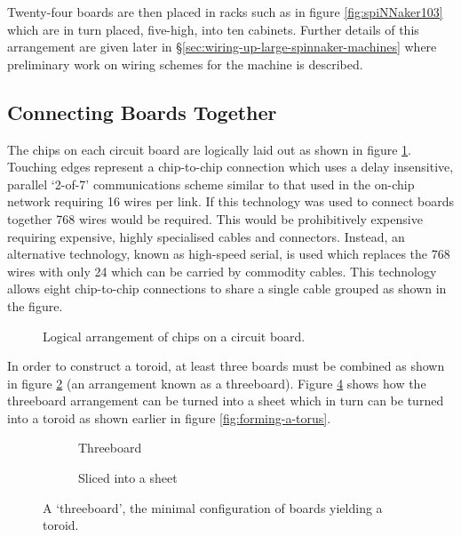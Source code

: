 			Twenty-four boards are then placed in racks such as in figure
			\ref{fig:spiNNaker103} which are in turn placed, five-high, into ten
			cabinets. Further details of this arrangement are given later in
			\S\ref{sec:wiring-up-large-spinnaker-machines} where preliminary work on
			wiring schemes for the machine is described.
		
		\subsection{Connecting Boards Together}
			
			
			The chips on each circuit board are logically laid out as shown in figure
			\ref{fig:chipsOnBoard}. Touching edges represent a chip-to-chip connection
			which uses a delay insensitive, parallel `2-of-7' communications scheme
			similar to that used in the on-chip network requiring 16 wires per link.
			If this technology was used to connect boards together 768 wires would be
			required.  This would be prohibitively expensive requiring expensive,
			highly specialised cables and connectors. Instead, an alternative
			technology, known as high-speed serial, is used which replaces the 768
			wires with only 24 which can be carried by commodity cables. This
			technology allows eight chip-to-chip connections to share a single cable
			grouped as shown in the figure.
			
			\begin{figure}
				\center
				
				\caption{Logical arrangement of chips on a circuit board.}
				\label{fig:chipsOnBoard}
			\end{figure}
			
			In order to construct a toroid, at least three boards must be combined as
			shown in figure \ref{fig:threeboard} (an arrangement known as a
			threeboard).  Figure \ref{fig:threeboardSliced} shows how the threeboard
			arrangement can be turned into a sheet which in turn can be turned into a
			toroid as shown earlier in figure \ref{fig:forming-a-torus}.
			
			\begin{figure}
				\begin{subfigure}[b]{0.45\textwidth}
					\center
					
					\caption{Threeboard}
					\label{fig:threeboard}
				\end{subfigure}
				\begin{subfigure}[b]{0.45\textwidth}
					\center
					
					\caption{Sliced into a sheet}
					\label{fig:threeboardSliced}
				\end{subfigure}
				
				\caption[A `threeboard'.]{A `threeboard', the minimal configuration of
				boards yielding a toroid.}
			\end{figure}
			
